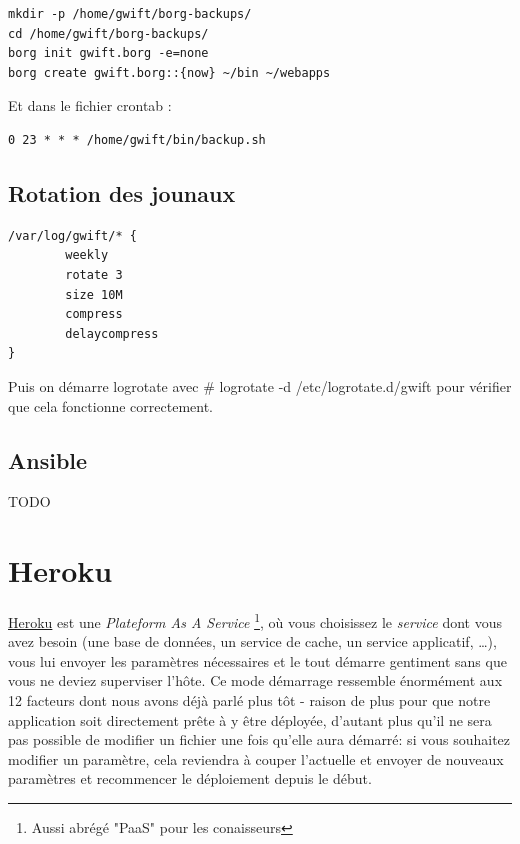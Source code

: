 \documentclass[11pt]{amsbook}
\begin{document}
\begin{verbatim}
mkdir -p /home/gwift/borg-backups/
cd /home/gwift/borg-backups/
borg init gwift.borg -e=none
borg create gwift.borg::{now} ~/bin ~/webapps
\end{verbatim}

Et dans le fichier crontab :


\begin{verbatim}
0 23 * * * /home/gwift/bin/backup.sh
\end{verbatim}

\hypertarget{x-rotation-des-jounaux}{\subsection{Rotation des jounaux}}
\begin{verbatim}
/var/log/gwift/* {
        weekly
        rotate 3
        size 10M
        compress
        delaycompress
}
\end{verbatim}

Puis on démarre logrotate avec \# logrotate -d /etc/logrotate.d/gwift pour vérifier que cela fonctionne correctement.


\hypertarget{x-ansible}{\subsection{Ansible}}
TODO


\hypertarget{x-heroku}{\section{Heroku}}
\href{https://www.heroku.com}{Heroku} est une \emph{Plateform As A Service} \footnote{Aussi abrégé "PaaS" pour les conaisseurs}, où vous choisissez le \emph{service} dont vous avez besoin (une base de données, un service de cache, un service applicatif, …​), vous lui envoyer les paramètres nécessaires et le tout démarre gentiment sans que vous ne deviez superviser l’hôte.
Ce mode démarrage ressemble énormément aux 12 facteurs dont nous avons déjà parlé plus tôt - raison de plus pour que notre application soit directement prête à y être déployée, d’autant plus qu’il ne sera pas possible de modifier un fichier une fois qu’elle aura démarré: si vous souhaitez modifier un paramètre, cela reviendra à couper l’actuelle et envoyer de nouveaux paramètres et recommencer le déploiement depuis le début.
\end{document}
